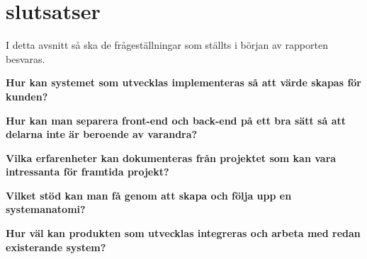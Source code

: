 \chapter{slutsatser}
I detta avsnitt så ska de frågeställningar som ställts i början av rapporten besvaras.

\textbf{Hur kan systemet som utvecklas implementeras så att värde skapas för kunden?}

\textbf{Hur kan man separera front-end och back-end på ett bra sätt så att delarna inte är beroende av varandra?}

\textbf{Vilka erfarenheter kan dokumenteras från projektet som kan vara intressanta för framtida projekt?}

\textbf{Vilket stöd kan man få genom att skapa och följa upp en systemanatomi?}

\textbf{Hur väl kan produkten som utvecklas integreras och arbeta med redan existerande system?}